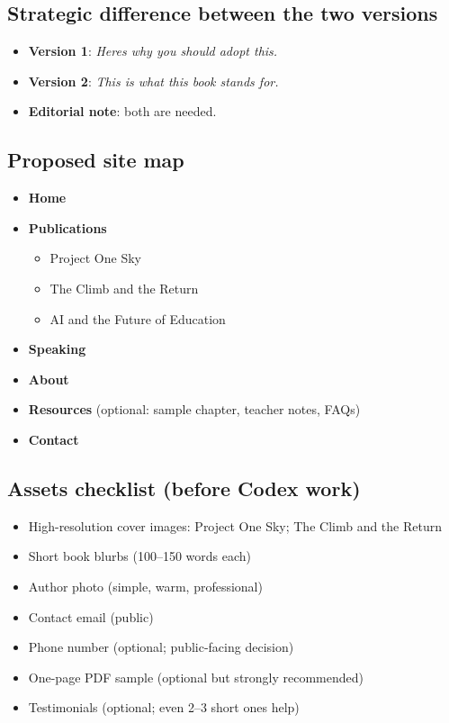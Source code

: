 \documentclass[11pt,a4paper]{article}
\begin{document}
\subsection{Strategic difference between the two versions}

\begin{itemize}
  \item \textbf{Version 1}: \textit{\textquotesingle Here\textquotesingle s why you should adopt this.\textquotesingle }
  \item \textbf{Version 2}: \textit{\textquotesingle This is what this book stands for.\textquotesingle }
  \item \textbf{Editorial note}: both are needed.
\end{itemize}

\subsection{Proposed site map}

\begin{itemize}
  \item \textbf{Home}
  \item \textbf{Publications}
    \begin{itemize}
      \item Project One Sky
      \item The Climb and the Return
      \item AI and the Future of Education
    \end{itemize}
  \item \textbf{Speaking}
  \item \textbf{About}
  \item \textbf{Resources} (optional: sample chapter, teacher notes, FAQs)
  \item \textbf{Contact}
\end{itemize}

\subsection{Assets checklist (before Codex work)}

\begin{itemize}
  \item High-resolution cover images: Project One Sky; The Climb and the Return
  \item Short book blurbs (100--150 words each)
  \item Author photo (simple, warm, professional)
  \item Contact email (public)
  \item Phone number (optional; public-facing decision)
  \item One-page PDF sample (optional but strongly recommended)
  \item Testimonials (optional; even 2--3 short ones help)
\end{itemize}
\end{document}
